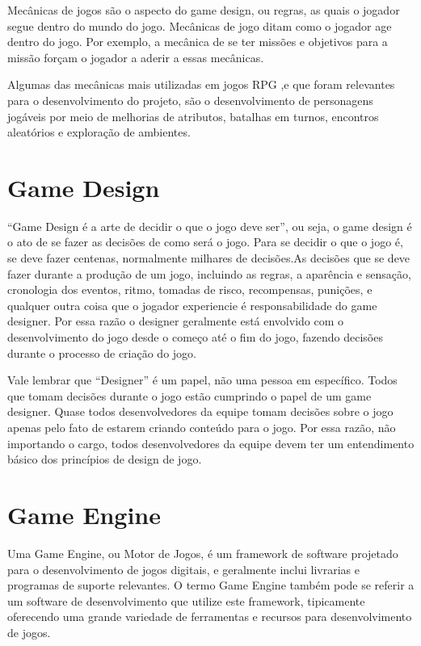 \documentclass[
	12pt,				%
	openright,			%
	twoside,			%
	a4paper,			%
	english,			%
	french,				%
	spanish,			%
	brazil				%
	]{abntex2}
\begin{document}
Mecânicas de jogos são o aspecto do game design, ou regras, as quais o jogador segue dentro do mundo do jogo. Mecânicas de jogo ditam como o jogador age dentro do jogo. Por exemplo, a mecânica de se ter missões e objetivos para a missão forçam o jogador a aderir a essas mecânicas.~\cite{GD:2021}

Algumas das mecânicas mais utilizadas em jogos RPG ,e que foram relevantes para o desenvolvimento do projeto, são o desenvolvimento de personagens jogáveis por meio de melhorias de atributos, batalhas em turnos, encontros aleatórios e exploração de ambientes.

\section{Game Design}

“Game Design é a arte de decidir o que o jogo deve ser”, ou seja, o game design é o ato de se fazer as decisões de como será o jogo. Para se decidir o que o jogo é, se deve fazer centenas, normalmente milhares de decisões.As decisões que se deve fazer durante a produção de um jogo, incluindo as regras, a aparência e sensação, cronologia dos eventos, ritmo, tomadas de risco, recompensas, punições, e qualquer outra coisa que o jogador experiencie é responsabilidade do game designer. Por essa razão o designer geralmente está envolvido com o desenvolvimento do jogo desde o começo até o fim do jogo, fazendo decisões durante o processo de criação do jogo. ~\cite{TheArt}

	Vale lembrar que “Designer” é um papel, não uma pessoa em específico. Todos que tomam decisões durante o jogo estão cumprindo o papel de um game designer. Quase todos desenvolvedores da equipe tomam decisões sobre o jogo apenas pelo fato de estarem criando conteúdo para o jogo. Por essa razão, não importando o cargo, todos desenvolvedores da equipe devem ter um entendimento básico dos princípios de design de jogo.~\cite{TheArt}

\section{Game Engine}

Uma Game Engine, ou Motor de Jogos, é um framework de software projetado para 
o desenvolvimento de jogos digitais, e geralmente inclui livrarias e programas de suporte relevantes. O termo Game Engine também pode se referir a um software de desenvolvimento que utilize este framework, tipicamente oferecendo uma grande variedade de ferramentas e recursos para desenvolvimento de jogos.~\cite{Wiki03}
\end{document}
